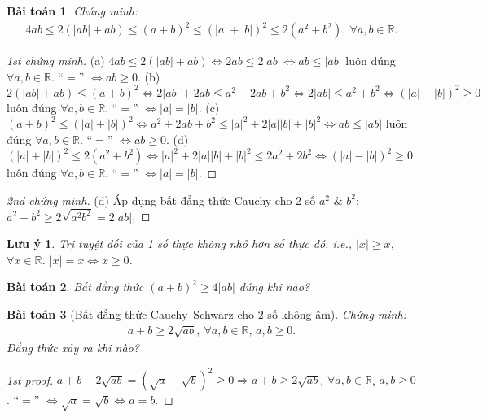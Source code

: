\documentclass{article}
\newtheorem{baitoan}{Bài toán}
\newtheorem{luuy}{Lưu ý}
\begin{document}
\begin{baitoan}
	Chứng minh:
	\begin{align}
		\label{1}
		4ab\le2(|ab| + ab)\le(a + b)^2\le(|a| + |b|)^2\le2(a^2 + b^2),\ \forall a,b\in\mathbb{R}.
	\end{align}
\end{baitoan}

\begin{proof}[1st chứng minh]
	(a) $4ab\le2(|ab| + ab)\Leftrightarrow2ab\le2|ab|\Leftrightarrow ab\le|ab|$ luôn đúng $\forall a,b\in\mathbb{R}$. ``$=$'' $\Leftrightarrow ab\ge0$. (b) $2(|ab| + ab)\le(a + b)^2\Leftrightarrow2|ab| + 2ab\le a^2 + 2ab + b^2\Leftrightarrow2|ab|\le a^2 + b^2\Leftrightarrow(|a| - |b|)^2\ge0$ luôn đúng $\forall a,b\in\mathbb{R}$. ``$=$'' $\Leftrightarrow|a| = |b|$. (c) $(a + b)^2\le(|a| + |b|)^2\Leftrightarrow a^2 + 2ab + b^2\le|a|^2 + 2|a||b| + |b|^2\Leftrightarrow ab\le|ab|$ luôn đúng $\forall a,b\in\mathbb{R}$. ``$=$'' $\Leftrightarrow ab\ge0$. (d) $(|a| + |b|)^2\le2(a^2 + b^2)\Leftrightarrow|a|^2 + 2|a||b| + |b|^2\le2a^2 + 2b^2\Leftrightarrow(|a| - |b|)^2\ge0$ luôn đúng $\forall a,b\in\mathbb{R}$. ``$=$'' $\Leftrightarrow|a| = |b|$.
\end{proof}

\begin{proof}[2nd chứng minh]
	(d) Áp dụng bất đẳng thức Cauchy cho 2 số $a^2$ \& $b^2$: $a^2 + b^2\ge2\sqrt{a^2b^2} = 2|ab|$, 
\end{proof}

\begin{luuy}
	Trị tuyệt đối của 1 số thực không nhỏ hơn số thực đó, i.e., $|x|\ge x$, $\forall x\in\mathbb{R}$. $|x| = x\Leftrightarrow x\ge0$.
\end{luuy}

\begin{baitoan}
	Bất đẳng thức $(a + b)^2\ge4|ab|$ đúng khi nào?
\end{baitoan}

\begin{baitoan}[Bất đẳng thức Cauchy--Schwarz cho 2 số không âm]
	Chứng minh:
	\begin{align*}
		\boxed{a + b\ge2\sqrt{ab},\ \forall a,b\in\mathbb{R},\,a,b\ge 0.}
	\end{align*}
	Đẳng thức xảy ra khi nào?
\end{baitoan}

\begin{proof}[1st proof]
	$a + b - 2\sqrt{ab} = (\sqrt{a} - \sqrt{b})^2\ge0\Rightarrow a + b\ge2\sqrt{ab}$, $\forall a,b\in\mathbb{R}$, $a,b\ge 0$. ``$=$'' $\Leftrightarrow\sqrt{a} = \sqrt{b}\Leftrightarrow a = b$.
\end{proof}
\end{document}
